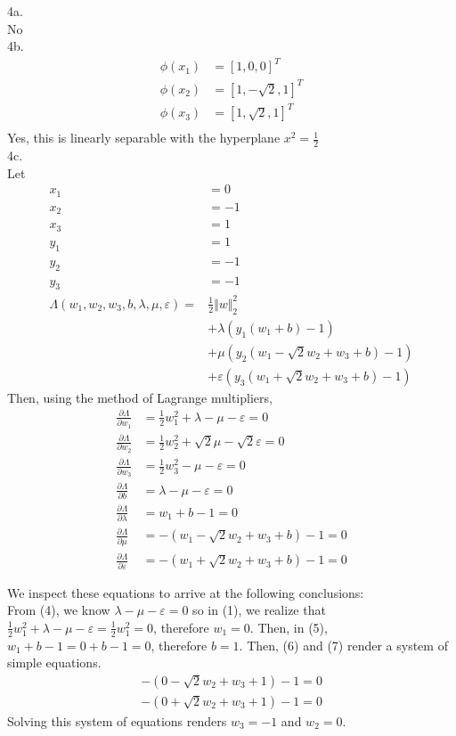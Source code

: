 \documentclass{article}
\begin{document}
4a. \\
No\\

4b. \\
\begin{align*}
  \phi(x_1) &= [1, 0, 0]^T\\
  \phi(x_2) &= [1, -\sqrt{2}, 1]^T\\
  \phi(x_3) &= [1, \sqrt{2}, 1]^T\\
\end{align*}
  Yes, this is linearly separable with the hyperplane \(x^2 = \frac{1}{2}\)\\

4c. \\
Let 
\begin{align*}
  x_1 &= 0\\
  x_2 &= -1\\
  x_3 &= 1\\
  y_1 &= 1\\
  y_2 &= -1\\
  y_3 &= -1\\
  \Lambda(w_1, w_2, w_3, b, \lambda, \mu, \varepsilon)
  =& \frac{1}{2}\Vert w\Vert _2^2\\
  &+ \lambda(y_1(w_1+b) - 1)\\
  &+ \mu(y_2(w_1-\sqrt{2}w_2 + w_3 + b) - 1)\\
  &+ \varepsilon(y_3(w_1 + \sqrt{2}w_2 + w_3 + b) - 1)
\end{align*}
Then, using the method of Lagrange multipliers,
\begin{align}
\frac{\partial\Lambda}{\partial w_1} &= \frac{1}{2}w_1^2 + \lambda - \mu - \varepsilon = 0\\
\frac{\partial\Lambda}{\partial w_2} &= \frac{1}{2}w_2^2 + \sqrt{2}\mu - \sqrt{2}\varepsilon = 0\\
\frac{\partial\Lambda}{\partial w_3} &= \frac{1}{2}w_3^2 - \mu - \varepsilon = 0\\
\frac{\partial\Lambda}{\partial b} &= \lambda - \mu - \varepsilon = 0\\
\frac{\partial\Lambda}{\partial \lambda} &= w_1 + b - 1 = 0\\
\frac{\partial\Lambda}{\partial \mu} &= -(w_1 - \sqrt{2}w_2 + w_3 + b) - 1 = 0\\
\frac{\partial\Lambda}{\partial \varepsilon} &= -(w_1 + \sqrt{2}w_2 + w_3 + b) - 1 = 0
\end{align}

We inspect these equations to arrive at the following conclusions:\\
From (4), we know \(\lambda - \mu - \varepsilon = 0\) so in (1), we realize that \(\frac{1}{2}w_1^2 + \lambda - \mu - \varepsilon = \frac{1}{2}w_1^2 = 0\), therefore \(w_1 = 0\). Then, in (5), \(w_1 + b - 1 = 0 + b - 1 = 0\), therefore \(b = 1\). Then, (6) and (7) render a system of simple equations.
\begin{gather*}
  -(0-\sqrt{2}w_2+w_3+1)-1 = 0\\
  -(0+\sqrt{2}w_2+w_3+1)-1 = 0
\end{gather*}
Solving this system of equations renders \(w_3 = -1\) and \(w_2 = 0\).
\end{document}
